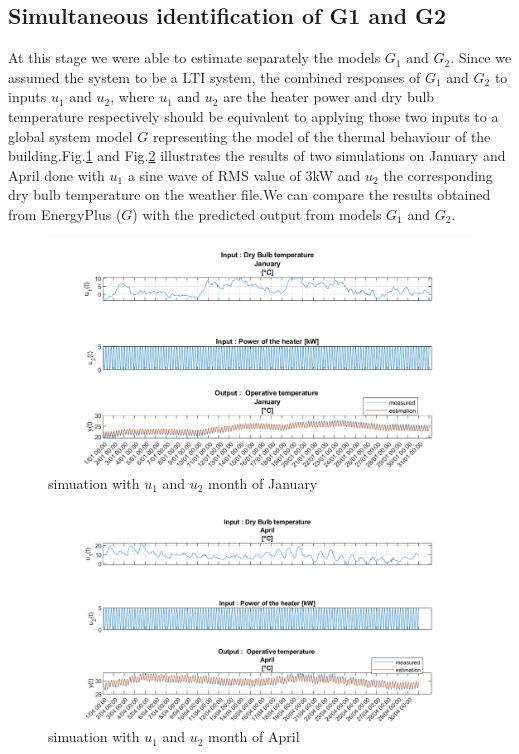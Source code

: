 \documentclass[a4paper,12pt]{article}
\numberwithin{equation}{section}
\begin{document}
\subsection{Simultaneous identification of G1 and G2}
At this stage we were able to estimate separately the models $G_{1}$ and $G_{2}$. Since we assumed the system to be a LTI system, the combined responses of $G_{1}$ and $G_{2}$ to inputs $u_{1}$ and $u_{2}$, where $u_{1}$ and $u_{2}$ are the heater power and dry bulb temperature respectively should be equivalent to applying those two inputs to a global system model $G$ representing the model of the thermal behaviour of the building.Fig.\ref{fig;heatDrycombJan} and 
Fig.\ref{fig;heatDrycombApr} illustrates the results of two simulations on January and April done with $u_{1}$ a sine wave of RMS value of 3kW and $u_{2}$ the corresponding dry bulb temperature on the weather file.We can compare the results obtained from EnergyPlus ($G$) with the predicted output from  models $G_{1}$ and $G_{2}$.

\begin{figure}[H]
    \includegraphics[width=\textwidth]{heatDrycombJan.png}
    \centering
    \caption{simuation with $u_{1}$ and $u_{2}$  month of January}
    \label{fig;heatDrycombJan}
\end{figure}
\begin{figure}[H]
    \includegraphics[width=\textwidth]{heatDrycombApr.png}
    \centering
    \caption{simuation with $u_{1}$ and $u_{2}$  month of April}
    \label{fig;heatDrycombApr}
\end{figure}
\end{document}
